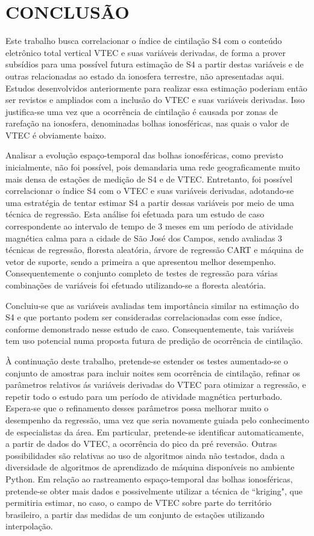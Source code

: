 \chapter{CONCLUSÃO}

Este trabalho busca correlacionar o índice de cintilação S4 com o conteúdo eletrônico total vertical VTEC e suas variáveis derivadas, de forma a prover subsídios para uma possível futura estimação de S4 a partir destas variáveis e de outras relacionadas ao estado da ionosfera terrestre, não apresentadas aqui. Estudos desenvolvidos anteriormente para realizar essa estimação \cite{REZENDE:2009, GLAUSTON:2014, GLAUSTON:2015} poderiam então ser revistos e ampliados com a inclusão do VTEC e suas variáveis derivadas. Isso justifica-se uma vez que a ocorrência de cintilação é causada por zonas de rarefação na ionosfera, denominadas bolhas ionosféricas, nas quais o valor de VTEC é obviamente baixo.

Analisar a evolução espaço-temporal das bolhas ionosféricas, como previsto inicialmente, não foi possível, pois demandaria uma rede geograficamente muito mais densa de estações de medição de S4 e de VTEC. Entretanto, foi possível correlacionar o índice S4 com o VTEC e suas variáveis derivadas, adotando-se uma estratégia de tentar estimar S4 a partir dessas variáveis por meio de uma técnica de regressão. Esta análise foi efetuada para um estudo de caso correspondente ao intervalo de tempo de 3 meses em um período de atividade magnética calma para a cidade de São José dos Campos, sendo avaliadas 3 técnicas de regressão, floresta aleatória, árvore de regressão CART e máquina de vetor de suporte, sendo a primeira a que apresentou melhor desempenho. Consequentemente o conjunto completo de testes de regressão para várias combinações de variáveis foi efetuado utilizando-se a floresta aleatória.

Concluiu-se que as variáveis avaliadas tem importância similar na estimação do S4 e que portanto podem ser consideradas correlacionadas com esse índice, conforme demonstrado nesse estudo de caso. Consequentemente, tais variáveis tem uso potencial numa proposta futura de predição de ocorrência de cintilação.

À continuação deste trabalho, pretende-se estender os testes aumentado-se o conjunto de amostras para incluir noites sem ocorrência de cintilação, refinar os parâmetros relativos ás variáveis derivadas do VTEC para otimizar a regressão, e repetir todo o estudo para um período de atividade magnética perturbado. Espera-se que o refinamento desses parâmetros possa melhorar muito o desempenho da regressão, uma vez que seria novamente guiada pelo conhecimento de especialistas da área. Em particular, pretende-se identificar automaticamente, a partir de dados do VTEC, a ocorrência do pico da pré reversão. Outras possibilidades são relativas ao uso de algoritmos ainda não testados, dada a diversidade de algoritmos de aprendizado de máquina disponíveis no ambiente Python. Em relação ao rastreamento espaço-temporal das bolhas ionosféricas, pretende-se obter mais dados e possivelmente utilizar a técnica de ``kriging", que permitiria estimar, no caso, o campo de VTEC sobre parte do território brasileiro, a partir das medidas de um conjunto de estações utilizando interpolação.
